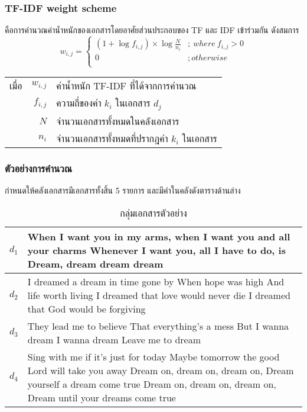 \documentclass[11pt,a4paper]{article}
\begin{document}
\subsubsection{TF-IDF weight scheme}
คือการคำนวณค่าน้ำหนักของเอกสารโดยอาศัยส่วนประกอบของ TF และ IDF เข้าร่วมกัน ดังสมการ
\begin{equation}
    w_{i,j} = 
    \begin{cases}
        (1 + \log{f_{i,j}}) \times \log{\frac{N}{n_i}} &;\ where\ f_{i,j} > 0 \\
        0                   &; otherwise \\
    \end{cases}
    \label{eq:tfidf}
\end{equation}
\begin{table}[ht!]
    \begin{tabular}{lrl}
        เมื่อ & $w_{i,j}$     & ค่าน้ำหนัก TF-IDF ที่ได้จากการคำนวณ \\
            & $f_{i,j}$     & ความถี่ของคำ $k_i$ ในเอกสาร $d_j$ \\
            & $N$           & จำนวนเอกสารทั้งหมดในคลังเอกสาร \\
            & $n_i$         & จำนวนเอกสารทั้งหมดที่ปรากฎคำ $k_i$ ในเอกสาร 
    \end{tabular}
\end{table}

\subsubsection{ตัวอย่างการคำนวณ}
กำหนดให้คลังเอกสารมีเอกสารทั้งสิ้น 5 รายการ และมีคำในคลังดังตารางด้านล่าง

\begin{table}[ht!]
    \centering
    \caption{กลุ่มเอกสารตัวอย่าง}
    \label{tab:datacollection}
    \begin{tabular}{|p{2cm}||p{}|}
        \hline
        $d_1$   & When I want you in my arms, when I want you and all your charms Whenever I want you, all I have to do, is Dream, dream dream dream \\ 
        \hline
        $d_2$   & I dreamed a dream in time gone by When hope was high And life worth living I dreamed that love would never die I dreamed that God would be forgiving \\ 
        \hline
        $d_3$   & They lead me to believe That everything’s a mess But I wanna dream I wanna dream Leave me to dream \\
        \hline
        $d_4$   &   Sing with me if it's just for today Maybe tomorrow the good Lord will take you away Dream on, dream on, dream on, Dream yourself a dream come true Dream on, dream on, dream on, Dream until your dreams come true \\
        \hline
    \end{tabular}
\end{table}
\end{document}
